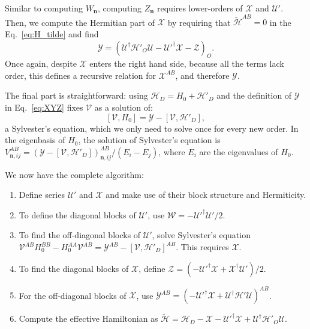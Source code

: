%
Similar to computing $W_{\mathbf{n}}$, computing $Z_{\mathbf{n}}$ requires lower-orders of $\mathcal{X}$ and $\mathcal{U}'$.
Then, we compute the Hermitian part of $\mathcal{X}$ by requiring that $\tilde{\mathcal{H}}^{AB} = 0$ in the Eq.~\eqref{eq:H_tilde} and find
%
\begin{equation}
\label{eq:Y}
\mathcal{Y} = (\mathcal{U}^\dagger \mathcal{H}'_{O} \mathcal{U} -
\mathcal{U}'^\dagger \mathcal{X} - \mathcal{Z})_{O}.
\end{equation}
%
Once again, despite $\mathcal{X}$ enters the right hand side, because all the terms lack  order, this defines a recursive relation for $\mathcal{X}^{AB}$, and therefore $\mathcal{Y}$.

The final part is straightforward: using $\mathcal{H}_{D} = H_0 + \mathcal{H}'_{D}$ and the definition of $\mathcal{Y}$ in Eq.~\eqref{eq:XYZ} fixes $\mathcal{V}$ as a solution of:
%
\begin{equation}
\label{eq:sylvester}
[\mathcal{V}, H_0] = \mathcal{Y} - [\mathcal{V}, \mathcal{H}'_{D}],
\end{equation}
%
a Sylvester's equation, which we only need to solve once for every new order.
In the eigenbasis of $H_0$, the solution of Sylvester's equation is $V^{AB}_{\mathbf{n}, ij} = (\mathcal{Y} - [\mathcal{V}, \mathcal{H}'_{D}])^{AB}_{\mathbf{n}, ij}/(E_i - E_j)$, where $E_i$ are the eigenvalues of $H_0$.

We now have the complete algorithm:
%
\begin{enumerate}
    \item Define series $\mathcal{U}'$ and $\mathcal{X}$ and make use of their block structure and Hermiticity.
    \item To define the diagonal blocks of $\mathcal{U}'$, use $\mathcal{W} = -\mathcal{U}'^\dagger\mathcal{U}'/2$.
    \item To find the off-diagonal blocks of $\mathcal{U}'$, solve Sylvester's equation \\ $\mathcal{V}^{AB}H_0^{BB} - H_0^{AA}\mathcal{V}^{AB} = \mathcal{Y}^{AB} - [\mathcal{V}, \mathcal{H}'_{D}]^{AB}$.
      This requires $\mathcal{X}$.
    \item To find the diagonal blocks of $\mathcal{X}$, define $\mathcal{Z} = (-\mathcal{U}'^\dagger\mathcal{X} + \mathcal{X}^\dagger\mathcal{U}')/2$.
    \item For the off-diagonal blocks of $\mathcal{X}$, use $\mathcal{Y}^{AB} =
    (-\mathcal{U}'^\dagger\mathcal{X} + \mathcal{U}^\dagger\mathcal{H}'\mathcal{U})^{AB}$.
    \item  Compute the effective Hamiltonian as $\tilde{\mathcal{H}} = \mathcal{H}_{D} - \mathcal{X} - \mathcal{U}'^\dagger \mathcal{X} + \mathcal{U}^\dagger\mathcal{H}'_{O}\mathcal{U}$.
\end{enumerate}

